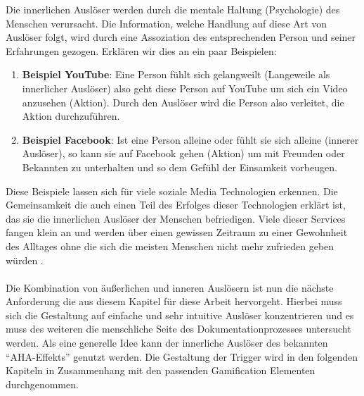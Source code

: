 \documentclass[a4paper,12pt]{scrartcl}
\begin{document}
Die innerlichen Auslöser werden durch die mentale Haltung (Psychologie) des Menschen verursacht. Die Information, welche Handlung auf diese Art von Auslöser folgt, wird durch eine Assoziation des entsprechenden Person und seiner Erfahrungen gezogen. Erklären wir dies an ein paar Beispielen:
\begin{enumerate}
      \item \textbf{Beispiel YouTube}: Eine Person fühlt sich gelangweilt (Langeweile als innerlicher Auslöser) also geht diese Person auf YouTube um sich ein Video anzusehen (Aktion). Durch den Auslöser wird die Person also verleitet, die Aktion durchzuführen. 
      \item \textbf{Beispiel Facebook}: Ist eine Person alleine oder fühlt sie sich alleine (innerer Auslöser), so kann sie auf Facebook gehen (Aktion) um mit Freunden oder Bekannten zu unterhalten und so dem Gefühl der Einsamkeit vorbeugen.
\end{enumerate}
Diese Beispiele lassen sich für viele soziale Media Technologien erkennen. Die Gemeinsamkeit die auch einen Teil des Erfolges dieser Technologien erklärt ist, das sie die innerlichen Auslöser der Menschen befriedigen. Viele dieser Services fangen klein an und werden über einen gewissen Zeitraum zu einer Gewohnheit des Alltages ohne die sich die meisten Menschen nicht mehr zufrieden geben würden \cite{Eyal2014}.
\\\\
Die Kombination von äußerlichen und inneren Auslösern ist nun die nächste Anforderung die aus diesem Kapitel für diese Arbeit hervorgeht. Hierbei muss sich die Gestaltung auf einfache und sehr intuitive Auslöser konzentrieren und es muss des weiteren die menschliche Seite des Dokumentationprozesses untersucht werden. Als eine generelle Idee kann der innerliche Auslöser des bekannten \enquote{AHA-Effekts} genutzt werden. Die Gestaltung der Trigger wird in den folgenden Kapiteln in Zusammenhang mit den passenden Gamification Elementen durchgenommen.  
\end{document}
